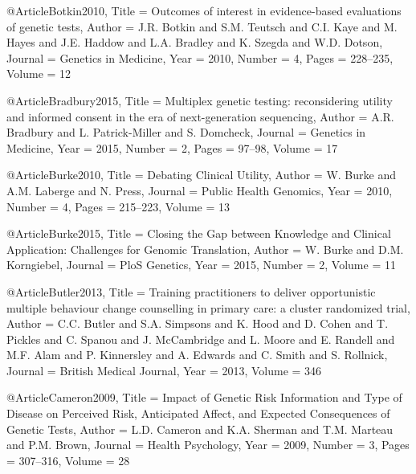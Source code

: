 @Article{Botkin2010,
  Title                    = {Outcomes of interest in evidence-based evaluations of genetic tests},
  Author                   = {J.R. Botkin and S.M. Teutsch and C.I. Kaye and M. Hayes and J.E. Haddow and L.A. Bradley and K. Szegda and W.D. Dotson},
  Journal                  = {Genetics in Medicine},
  Year                     = {2010},
  Number                   = {4},
  Pages                    = {228--235},
  Volume                   = {12}
}

@Article{Bradbury2015,
  Title                    = {Multiplex genetic testing: reconsidering utility and informed consent in the era of next-generation sequencing},
  Author                   = {A.R. Bradbury and L. Patrick-Miller and S. Domcheck},
  Journal                  = {Genetics in Medicine},
  Year                     = {2015},
  Number                   = {2},
  Pages                    = {97--98},
  Volume                   = {17}
}

@Article{Burke2010,
  Title                    = {Debating Clinical Utility},
  Author                   = {W. Burke and A.M. Laberge and N. Press},
  Journal                  = {Public Health Genomics},
  Year                     = {2010},
  Number                   = {4},
  Pages                    = {215--223},
  Volume                   = {13}
}

@Article{Burke2015,
  Title                    = {Closing the Gap between Knowledge and Clinical Application: Challenges for Genomic Translation},
  Author                   = {W. Burke and D.M. Korngiebel},
  Journal                  = {PloS Genetics},
  Year                     = {2015},
  Number                   = {2},
  Volume                   = {11}
}

@Article{Butler2013,
  Title                    = {Training practitioners to deliver opportunistic multiple behaviour change counselling in primary care: a cluster randomized trial},
  Author                   = {C.C. Butler and S.A. Simpsons and K. Hood and D. Cohen and T. Pickles and C. Spanou and J. McCambridge and L. Moore and E. Randell and M.F. Alam and P. Kinnersley and A. Edwards and C. Smith and S. Rollnick},
  Journal                  = {British Medical Journal},
  Year                     = {2013},
  Volume                   = {346}
}

@Article{Cameron2009,
  Title                    = {Impact of Genetic Risk Information and Type of Disease on Perceived Risk, Anticipated Affect, and Expected Consequences of Genetic Tests},
  Author                   = {L.D. Cameron and K.A. Sherman and T.M. Marteau and P.M. Brown},
  Journal                  = {Health Psychology},
  Year                     = {2009},
  Number                   = {3},
  Pages                    = {307--316},
  Volume                   = {28}
}

